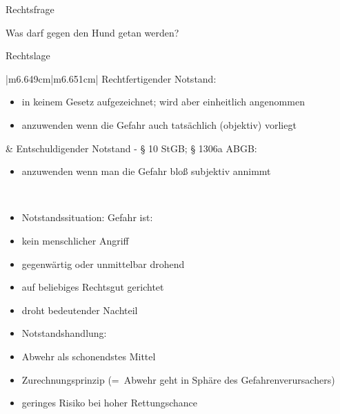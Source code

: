 \documentclass{article}
\begin{document}
Rechtsfrage

Was darf gegen den Hund getan werden?

Rechtslage

\begin{center}
\tablehead{}\begin{supertabular}{|m{6.649cm}|m{6.651cm}|}
\hline
Rechtfertigender Notstand: 

\begin{itemize}
\item in keinem Gesetz aufgezeichnet; wird aber einheitlich angenommen

\item anzuwenden wenn die Gefahr auch tats\"achlich (objektiv) vorliegt

\end{itemize}
 &
Entschuldigender Notstand - {\S} 10 StGB; {\S} 1306a ABGB:

\begin{itemize}
\item anzuwenden wenn man die Gefahr blo{\ss} subjektiv annimmt 

\end{itemize}
\\
\begin{itemize}
\item Notstandssituation: Gefahr ist:

\end{itemize}
\begin{itemize}
\item kein menschlicher Angriff

\item gegenw\"artig oder unmittelbar drohend

\item auf beliebiges Rechtsgut gerichtet

\item droht bedeutender Nachteil

\end{itemize}
\begin{itemize}
\item Notstandshandlung:

\end{itemize}
\begin{itemize}
\item Abwehr als schonendstes Mittel

\item Zurechnungsprinzip (=~Abwehr geht in Sph\"are des
Gefahrenverursachers)

\item geringes Risiko bei hoher Rettungschance 


\end{itemize}
\end{supertabular}
\end{center}
\end{document}
